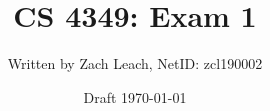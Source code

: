 

\title{\Huge CS 4349: Exam 1}
\author{\Large Written by Zach Leach, NetID: zcl190002}
\date{\Large Draft \today \\[36pt]}


\maketitle


